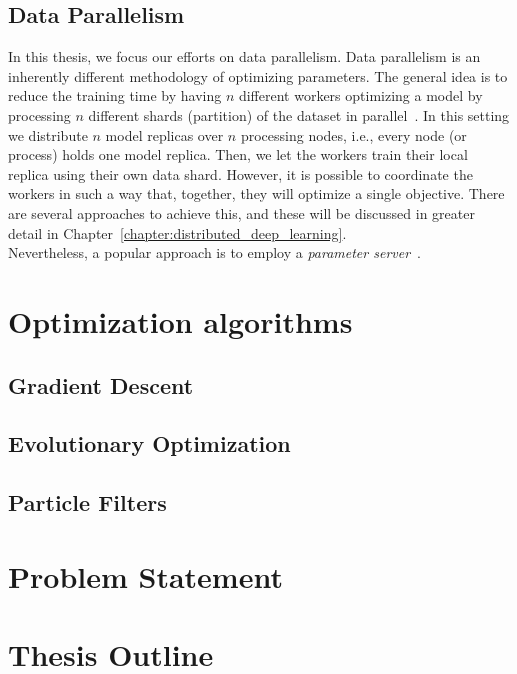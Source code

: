 \subsection{Data Parallelism}
\label{sec:intro_data_parallelism}

In this thesis, we focus our efforts on data parallelism. Data parallelism is an inherently different methodology of optimizing parameters. The general idea is to reduce the training time by having $n$ different workers optimizing a model by processing $n$ different shards (partition) of the dataset in parallel~\cite{dean2012large}. In this setting we distribute $n$ model replicas over $n$ processing nodes, i.e., every node (or process) holds one model replica. Then, we let the workers train their local replica using their own data shard. However, it is possible to coordinate the workers in such a way that, together, they will optimize a single objective. There are several approaches to achieve this, and these will be discussed in greater detail in Chapter~\ref{chapter:distributed_deep_learning}.\\

Nevertheless, a popular approach is to employ a \emph{parameter server}~\cite{dean2012large, zhang2015deep, recht2011hogwild}.

\begin{figure}[H]
  \begin{tikzpicture}
  \end{tikzpicture}
  \caption{}
  \label{fig:introduction_data_parallelism_schematic}
\end{figure}

\section{Optimization algorithms}
\label{sec:intro_optimization_algorithms}

\subsection{Gradient Descent}
\label{sec:gradient_descent}

\subsection{Evolutionary Optimization}
\label{sec:evolutionary_optimization}

\subsection{Particle Filters}
\label{sec:particle_filters}

\section{Problem Statement}
\label{sec:problem_statement}

\section{Thesis Outline}
\label{sec:thesis_outline}
